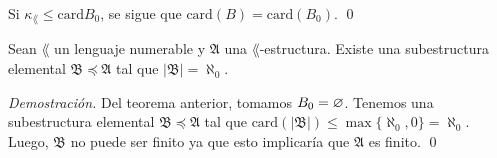 Si $\kappa_\lang \leq \mathrm{card}{B_0}$, se sigue que $\mathrm{card} (B) = \mathrm{card} (B_0)$. \qed
\begin{corollary}
  Sean $\lang$ un lenguaje numerable y $\mathfrak{A}$ una $\lang$-estructura.
  Existe una subestructura elemental $\mathfrak{B} \preceq \mathfrak{A}$ tal que $|\mathfrak{B}| = \aleph_0$. 
\end{corollary} \hfill \break
\emph{Demostraci\'on.} \hfill \break
Del teorema anterior, tomamos $B_0 = \varnothing$.
Tenemos una subestructura elemental $\mathfrak{B} \preceq \mathfrak{A}$ tal que $\mathrm{card} (|\mathfrak{B}|) \leq \max \{ \aleph_0, 0 \} = \aleph_0$.\\
Luego, $\mathfrak{B}$ no puede ser finito ya que esto implicar\'ia que $\mathfrak{A}$ es finito. \qed

